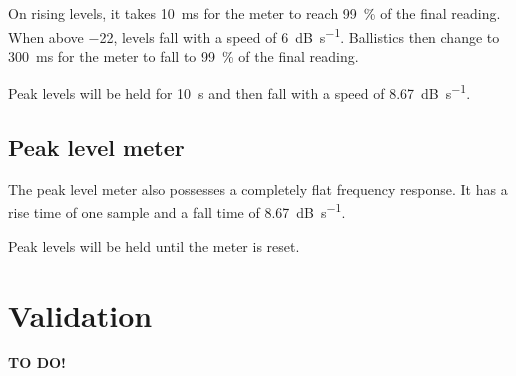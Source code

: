 On rising levels, it takes \SI{10}{\milli\second} for the meter to
reach \SI{99}{\percent} of the final reading.  When above
\SI{-22}{\dBFS}, levels fall with a speed of \SI{6}{\dB\per\second}.
Ballistics then change to \SI{300}{\milli\second} for the meter to
fall to \SI{99}{\percent} of the final reading.

Peak levels will be held for \SI{10}{\second} and then fall with a
speed of \SI{8.67}{\dB\per\second}.

\section{Peak level meter}

The peak level meter also possesses a completely flat frequency
response.  It has a rise time of one sample and a fall time of
\SI{8.67}{\dB\per\second}.

Peak levels will be held until the meter is reset.

\chapter{Validation}
\label{chap:validation}

\textbf{TO DO!}





